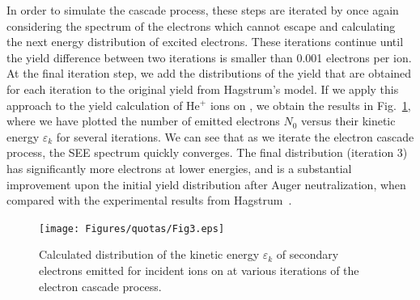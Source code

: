 \begin{refsection}
In order to simulate the cascade process, these steps are iterated by once 
again considering the spectrum of the electrons which cannot escape and 
calculating the next energy distribution of excited electrons. These 
iterations continue until the yield difference between two iterations is 
smaller than 0.001 electrons per ion. At the final iteration step, we add the 
distributions of the yield that are obtained for each iteration to the 
original yield from Hagstrum's model. If we apply this approach to the yield 
calculation of He$^+$ ions on , we obtain the results in 
Fig.~\ref{quotas:fig-iterations}, where we have plotted the number of emitted 
electrons $N_0$ versus their kinetic energy $\varepsilon_k$ for several 
iterations. We can see that as we iterate the electron cascade process, the 
SEE spectrum quickly converges. The final distribution (iteration 3) has 
significantly more electrons at lower energies, and is a substantial 
improvement upon the initial yield distribution after Auger neutralization, 
when compared with the experimental results from Hagstrum~\cite{Hagstrum1960}. 
 
\begin{figure}[ht] 
\centering 
\texttt{[image: Figures/quotas/Fig3.eps]} 
\caption{\label{quotas:fig-iterations} Calculated distribution of the kinetic 
energy $\varepsilon_k$ of secondary electrons emitted for incident  
ions on  at various iterations of the electron cascade process.} 
\end{figure} 



\end{refsection}
